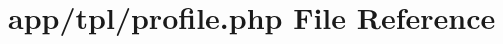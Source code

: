 \hypertarget{tpl_2profile_8php}{}\section{app/tpl/profile.php File Reference}
\label{tpl_2profile_8php}
